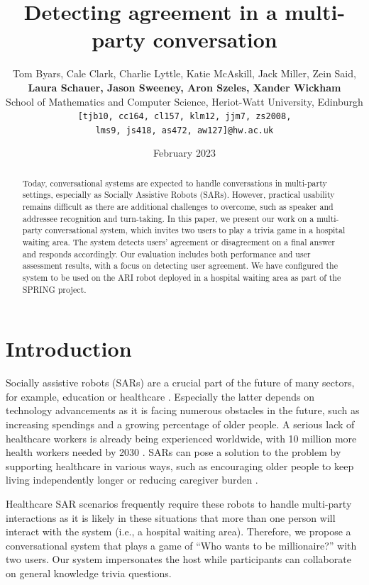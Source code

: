 \documentclass[hidelinks, 11pt]{article}
\title{Detecting agreement in a multi-party conversation}
\author{Tom Byars, Cale Clark, Charlie Lyttle, Katie McAskill, Jack Miller, Zein Said, \\
{\bf Laura Schauer, Jason Sweeney, Aron Szeles, Xander Wickham} \\
School of Mathematics and Computer Science, Heriot-Watt University, Edinburgh \\ {\tt {[tjb10, cc164, cl157, klm12, jjm7, zs2008,}} \\ {\tt {lms9, js418, as472, aw127]}@hw.ac.uk}}
\date{February 2023}
\begin{document}
\maketitle

\begin{abstract}
  Today, conversational systems are expected to handle conversations in multi-party settings, especially as Socially Assistive Robots (SARs). However, practical usability remains difficult as there are additional challenges to overcome, such as speaker and addressee recognition and turn-taking. In this paper, we present our work on a multi-party conversational system, which invites two users to play a trivia game in a hospital waiting area. The system detects users' agreement or disagreement on a final answer and responds accordingly. Our evaluation includes both performance and user assessment results, with a focus on detecting user agreement. We have configured the system to be used on the ARI robot deployed in a hospital waiting area as part of the SPRING project.
\end{abstract}

\section{Introduction}
\label{sec:introduction}

Socially assistive robots (SARs) are a crucial part of the future of many sectors, for example, education or healthcare \cite{gunson_visually_aware_2022}. Especially the latter depends on technology advancements as it is facing numerous obstacles in the future, such as increasing spendings and a growing percentage of older people. A serious lack of healthcare workers is already being experienced worldwide, with 10 million more health workers needed by 2030 \cite{cooper_ari_2020,Health_workforce_2023}. SARs can pose a solution to the problem by supporting healthcare in various ways, such as encouraging older people to keep living independently longer or reducing caregiver burden \cite{cooper_ari_2020}.

Healthcare SAR scenarios frequently require these robots to handle multi-party interactions as it is likely in these situations that more than one person will interact with the system (i.e., a hospital waiting area). Therefore, we propose a conversational system that plays a game of ``Who wants to be millionaire?'' with two users. Our system impersonates the host while participants can collaborate on general knowledge trivia questions.
\end{document}
